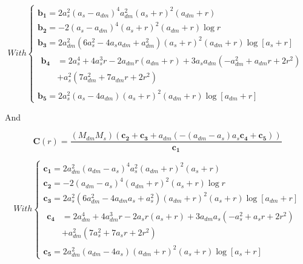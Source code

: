 \begin{equation}
With \left\lbrace
\begin{array}{lllll}
\mathbf{b_{1}}=2a_{s}^{2}(a_{s}-a_{dm})^{4}a_{dm}^{2}(a_{s}+r)^{2}(a_{dm}+r)\\
\mathbf{b_{2}}=-2\left(a_{s}-a_{dm}\right)^{4}\left(a_{s}+r\right)^{2}\left(a_{dm}+r\right)\log{r}\\
\mathbf{b_{3}}=2a_{dm}^{2}\left(6a_{s}^{2}-4a_{s}a_{dm}+a_{dm}^{2}\right)
\left(a_{s}+r\right)^{2}\left(a_{dm}+r\right)\log{[a_{s}+r]}\\
\begin{aligned}	
\mathbf{b_{4}} &= 2a_{s}^{4}+4a_{s}^{3}r-2a_{dm}r(a_{dm}+r)+3a_{s}a_{dm}\left(-a_{dm}^{2}+a_{dm}r+2r^{2}\right)\\      &+a_{s}^{2}\left(7a_{dm}^{2}+7a_{dm}r+2r^{2}\right)
\end{aligned}\\
\mathbf{b_{5}}=2a_{s}^{2}\left(a_{s}-4a_{dm}\right)\left(a_{s}+r\right)^{2}\left(a_{dm}+r\right)\log{[a_{dm}+r]}
\end{array}
\right.
\end{equation} 

And

\begin{equation}
\textbf{C}(r)=\frac{\left(M_{dm}M_{s}\right)\left(\mathbf{c_{2}}+\mathbf{c_{3}}+a_{dm}\left(-\left(a_{dm}-a_{s}\right)a_{s}\mathbf{c_{4}}+\mathbf{c_{5}}\right)\right)}{\mathbf{c_{1}}}
\end{equation}

\begin{equation}
With \left\lbrace
\begin{array}{lllll}
\mathbf{c_{1}}=2a_{dm}^{2}(a_{dm}-a_{s})^{4}a_{s}^{2}(a_{dm}+r)^{2}(a_{s}+r)\\
\mathbf{c_{2}}=-2\left(a_{dm}-a_{s}\right)^{4}\left(a_{dm}+r\right)^{2}\left(a_{s}+r\right)\log{r}\\
\mathbf{c_{3}}=2a_{s}^{2}\left(6a_{dm}^{2}-4a_{dm}a_{s}+a_{s}^{2}\right)\left(a_{dm}+r\right)^{2}
\left(a_{s}+r\right)\log{[a_{dm}+r]}\\
\begin{aligned}	
\mathbf{c_{4}} &= 2a_{dm}^{4}+4a_{dm}^{3}r-2a_{s}r(a_{s}+r)+3a_{dm}a_{s}\left(-a_{s}^{2}+a_{s}r+2r^{2}\right)\\      &+a_{dm}^{2}\left(7a_{s}^{2}+7a_{s}r+2r^{2}\right)
\end{aligned}\\
\mathbf{c_{5}} =2a_{dm}^{2}\left(a_{dm}-4a_{s}\right)\left(a_{dm}+r\right)^{2}\left(a_{s}+r\right)\log{[a_{s}+r]}
\end{array}
\right.
\end{equation} 


